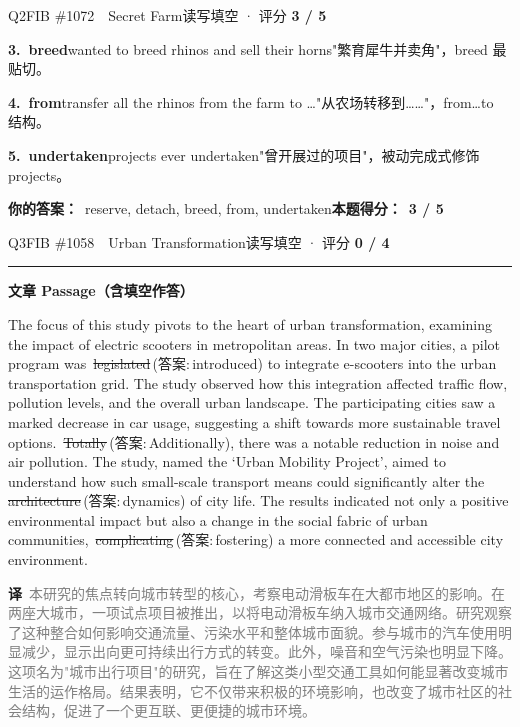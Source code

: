 \documentclass[11pt]{article}
\newcommand{\ptesub}[1]{%
  \par\needspace{2\baselineskip}\smallskip
  {\color{cAccent}\rule[-0.2ex]{3pt}{1.05em}}\hspace{6pt}%
  {\bfseries\color{cHead}#1}\par\nopagebreak\smallskip}
\newcommand{\zh}[1]{{\footnotesize\textcolor{cNote}{\textbf{译}}\ \textcolor{gray}{#1}}}
\newcommand{\rno}[2]{{\color{cWrong}\ding{55}\,\sout{#1}}\,{\footnotesize\color{cFix}(答案:\,#2)}}  %
\begin{document}
\begin{qblock}{Q2\quad FIB \#1072\ \ Secret Farm}{读写填空 · 评分 \textcolor{cAccent}{\bfseries 3 / 5}}
\begin{notebox}
\textbf{3.\ breed}\quad wanted to breed rhinos and sell their horns"繁育犀牛并卖角"，breed 最贴切。\par\smallskip
\textbf{4.\ from}\quad transfer all the rhinos from the farm to \dots"从农场转移到……"，from\dots to 结构。\par\smallskip
\textbf{5.\ undertaken}\quad projects ever undertaken"曾开展过的项目"，被动完成式修饰 projects。
\end{notebox}
\smallskip
\textbf{你的答案：}\ {\color{cWrong}reserve}, {\color{cWrong}detach}, breed, from, undertaken\qquad\textbf{本题得分：}\ {\color{cAccent}\bfseries 3 / 5}
\end{qblock}

\begin{qblock}{Q3\quad FIB \#1058\ \ Urban Transformation}{读写填空 · 评分 \textcolor{cAccent}{\bfseries 0 / 4}}
\ptesub{文章 Passage（含填空作答）}
\begin{promptbox}
The focus of this study pivots to the heart of urban transformation, examining the impact of electric scooters in metropolitan areas. In two major cities, a pilot program was \rno{legislated}{introduced} to integrate e-scooters into the urban transportation grid. The study observed how this integration affected traffic flow, pollution levels, and the overall urban landscape. The participating cities saw a marked decrease in car usage, suggesting a shift towards more sustainable travel options. \rno{Totally}{Additionally}, there was a notable reduction in noise and air pollution. The study, named the `Urban Mobility Project', aimed to understand how such small-scale transport means could significantly alter the \rno{architecture}{dynamics} of city life. The results indicated not only a positive environmental impact but also a change in the social fabric of urban communities, \rno{complicating}{fostering} a more connected and accessible city environment.
\end{promptbox}
\zh{本研究的焦点转向城市转型的核心，考察电动滑板车在大都市地区的影响。在两座大城市，一项试点项目被推出，以将电动滑板车纳入城市交通网络。研究观察了这种整合如何影响交通流量、污染水平和整体城市面貌。参与城市的汽车使用明显减少，显示出向更可持续出行方式的转变。此外，噪音和空气污染也明显下降。这项名为"城市出行项目"的研究，旨在了解这类小型交通工具如何能显著改变城市生活的运作格局。结果表明，它不仅带来积极的环境影响，也改变了城市社区的社会结构，促进了一个更互联、更便捷的城市环境。}

\end{qblock}
\end{document}

